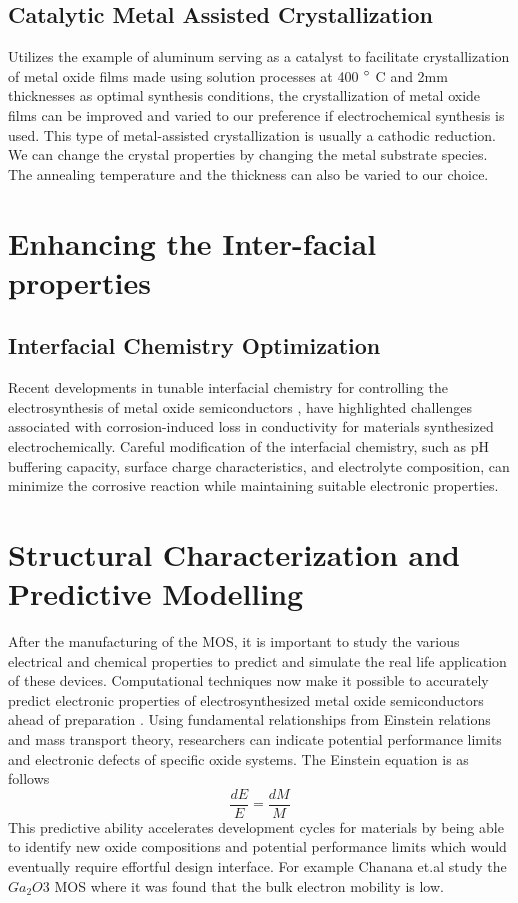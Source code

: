 \documentclass[12pt,a4paper]{report}
\begin{document}
	
	\subsection{Catalytic Metal Assisted Crystallization}
	Utilizes the example of aluminum serving as a catalyst to facilitate crystallization of metal oxide films made using solution processes at 400 $\degree$ C and 2mm thicknesses as optimal synthesis conditions, the crystallization of metal oxide films can be improved and varied to our preference if electrochemical synthesis is used. This type of metal-assisted crystallization is usually a cathodic reduction. We can change the crystal properties by changing the metal substrate species. The annealing temperature and the thickness can also be varied to our choice. \cite{Shin2020}
	
	
	
	
	\section{Enhancing the Inter-facial properties}
	
	\subsection{Interfacial Chemistry Optimization}
	Recent developments in tunable interfacial chemistry for controlling the electrosynthesis of metal oxide semiconductors \cite{Rajeshwar2023}, have highlighted challenges associated with corrosion-induced loss in conductivity for materials synthesized electrochemically. Careful modification of the interfacial chemistry, such as pH buffering capacity, surface charge characteristics, and electrolyte composition, can minimize the corrosive reaction while maintaining suitable electronic properties.

	
	\section{Structural Characterization and Predictive Modelling}
	After the manufacturing of the MOS, it is important to study the various electrical and chemical properties to predict and simulate the real life application of these devices. Computational techniques now make it possible to accurately predict electronic properties of electrosynthesized metal oxide semiconductors ahead of preparation \cite{Chanana2023}. Using fundamental relationships from Einstein relations and mass transport theory, researchers can indicate potential performance limits and electronic defects of specific oxide systems. The Einstein equation is as follows 
	$$\frac{dE}{E} = \frac{dM}{M} $$
	This predictive ability accelerates development cycles for materials by being able to identify new oxide compositions and potential performance limits which would eventually require effortful design interface. For example Chanana et.al study the $Ga_2O3$ MOS where it was found that the bulk electron mobility is low. 
	
\end{document}
